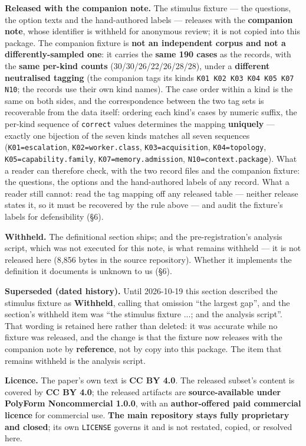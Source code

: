 \documentclass[10pt]{article}
\begin{document}
\textbf{Released with the companion note.} The stimulus fixture --- the questions, the option texts and the hand-authored labels --- releases with the \textbf{companion note}, whose identifier is withheld for anonymous review; it is not copied into this package. The companion fixture is \textbf{not an independent corpus and not a differently-sampled one}: it carries the \textbf{same 190 cases} as the records, with the \textbf{same per-kind counts} (30/30/26/22/26/28/28), under a \textbf{different neutralised tagging} (the companion tags its kinds \texttt{K01 K02 K03 K04 K05 K07 N10}; the records use their own kind names). The case order within a kind is the same on both sides, and the correspondence between the two tag sets is recoverable from the data itself: ordering each kind's cases by numeric suffix, the per-kind sequence of \texttt{correct} values determines the mapping \textbf{uniquely} --- exactly one bijection of the seven kinds matches all seven sequences (\texttt{K01=escalation}, \texttt{K02=worker.class}, \texttt{K03=acquisition}, \texttt{K04=topology}, \texttt{K05=capability.family}, \texttt{K07=memory.admission}, \texttt{N10=context.package}). What a reader can therefore check, with the two record files and the companion fixture: the questions, the options and the hand-authored labels of any record. What a reader still cannot: read the tag mapping off any released table --- neither release states it, so it must be recovered by the rule above --- and audit the fixture's labels for defensibility (\S6).

\textbf{Withheld.} The definitional section ships; and the pre-registration's analysis script, which was not executed for this note, is what remains withheld --- it is not released here (8,856 bytes in the source repository). Whether it implements the definition it documents is unknown to us (\S6).

\textbf{Superseded (dated history).} Until 2026-10-19 this section described the stimulus fixture as \textbf{Withheld}, calling that omission ``the largest gap'', and the section's withheld item was ``the stimulus fixture ...; and the analysis script''. That wording is retained here rather than deleted: it was accurate while no fixture was released, and the change is that the fixture now releases with the companion note by \textbf{reference}, not by copy into this package. The item that remains withheld is the analysis script.

\textbf{Licence.} The paper's own text is \textbf{CC BY 4.0}. The released subset's content is covered by \textbf{CC BY 4.0}; the released artifacts are \textbf{source-available under PolyForm Noncommercial 1.0.0}, with an \textbf{author-offered paid commercial licence} for commercial use. \textbf{The main repository stays fully proprietary and closed}; its own \texttt{LICENSE} governs it and is not restated, copied, or resolved here.
\end{document}
